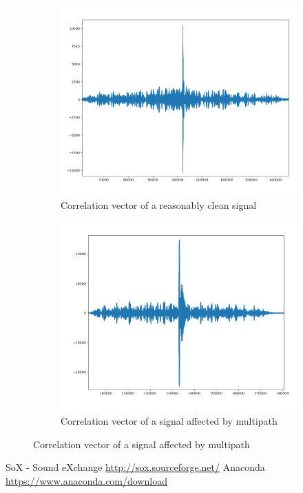 \documentclass[a4paper]{article}
\begin{document}
\begin{figure}[H]
    \centering
    \begin{subfigure}{0.45\textwidth}
        \includegraphics[width=1\textwidth]{correlation_clean.png}
        \caption{\label{fig:correlation_clean}Correlation vector of a reasonably clean signal}
    \end{subfigure}
    \begin{subfigure}{0.45\textwidth}
        \includegraphics[width=1\textwidth]{correlation_multipath.png}
        \caption{\label{fig:correlation_multipath}Correlation vector of a signal affected by multipath}
    \end{subfigure}
\end{figure}

\newpage


\begin{thebibliography}{9}
  SoX - Sound eXchange \url{http://sox.sourceforge.net/}
  Anaconda \url{https://www.anaconda.com/download}
\end{thebibliography}
\end{document}
